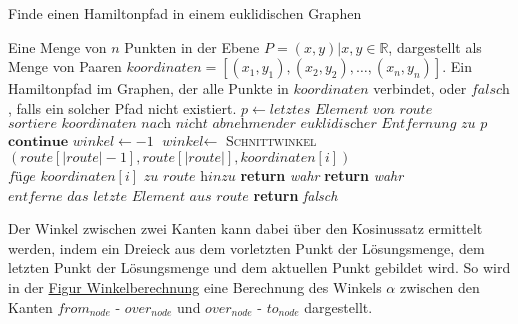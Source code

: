 \documentclass[a4paper,10pt,ngerman]{scrartcl}
\begin{document}
    \begin{algorithm}[H]
        \caption{Finde einen Hamiltonpfad in einem euklidischen Graphen}
        \begin{algorithmic}
            \Require Eine Menge von $n$ Punkten in der Ebene $P={(x,y)| x,y \in \mathbb{R}}$, dargestellt als Menge von Paaren $\textit{koordinaten}=[(x_1,y_1), (x_2,y_2),\dots, (x_n,y_n)]$.
            \Ensure Ein Hamiltonpfad im Graphen, der alle Punkte in $\textit{koordinaten}$ verbindet, oder $\textit{falsch}$, falls ein solcher Pfad nicht existiert.
                    \State $p\gets \textit{letztes Element von } \textit{route}$
                    \State $\textit{sortiere } \textit{koordinaten } \textit{nach nicht abnehmender euklidischer Entfernung zu } p$
                \EndIf
                        \State $\textbf{continue}$
                    \EndIf
                    \State $\textit{winkel}\gets -1$
                        \State $\textit{winkel}\gets$ \textsc{Schnittwinkel}$(\textit{route}[|\textit{route}|-1], \textit{route}[|\textit{route}|], \textit{koordinaten}[i])$
                    \EndIf
                        \State $\textit{füge }\textit{koordinaten}[i]\textit{ zu route hinzu}$
                            \State \textbf{return} \textit{wahr}
                        \EndIf
                            \State \textbf{return} \textit{wahr}
                        \Else
                            \State $\textit{entferne das letzte Element aus route}$
                        \EndIf
                    \EndIf
                \EndFor
                \State \textbf{return} \textit{falsch}
            \EndFunction
        \end{algorithmic}\label{alg:pseudo_greedy}
    \end{algorithm}

    Der Winkel zwischen zwei Kanten kann dabei über den Kosinussatz ermittelt werden,
    indem ein Dreieck aus dem vorletzten Punkt der Lösungsmenge,
    dem letzten Punkt der Lösungsmenge und dem aktuellen Punkt gebildet wird.
    So wird in der \hyperref[fig:figure2]{Figur Winkelberechnung} eine Berechnung des Winkels $\alpha$ zwischen den Kanten
    $from_{node}$ - $over_{node}$ und $over_{node}$ - $to_{node}$ dargestellt.
\end{document}
